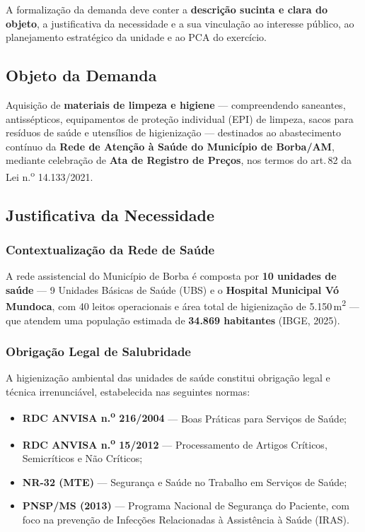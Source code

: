 \documentclass[12pt,a4paper]{article}
\begin{document}
\begin{legalbox}
\small
A formalização da demanda deve conter a \textbf{descrição sucinta e clara do objeto},
a justificativa da necessidade e a sua vinculação ao interesse público, ao
planejamento estratégico da unidade e ao PCA do exercício.
\end{legalbox}

\subsection{Objeto da Demanda}

Aquisição de \textbf{materiais de limpeza e higiene} --- compreendendo saneantes,
antissépticos, equipamentos de proteção individual (EPI) de limpeza, sacos para
resíduos de saúde e utensílios de higienização --- destinados ao abastecimento contínuo
da \textbf{Rede de Atenção à Saúde do Município de Borba/AM}, mediante celebração de
\textbf{Ata de Registro de Preços}, nos termos do art.\,82 da Lei n.\textsuperscript{o}
14.133/2021.

\subsection{Justificativa da Necessidade}

\subsubsection{Contextualização da Rede de Saúde}

A rede assistencial do Município de Borba é composta por \textbf{10 unidades de
saúde} --- 9 Unidades Básicas de Saúde (UBS) e o \textbf{Hospital Municipal Vó
Mundoca}, com 40 leitos operacionais e área total de higienização de
5.150\,m\textsuperscript{2} --- que atendem uma população estimada de
\textbf{34.869 habitantes} (IBGE, 2025).

\subsubsection{Obrigação Legal de Salubridade}

A higienização ambiental das unidades de saúde constitui obrigação legal e técnica
irrenunciável, estabelecida nas seguintes normas:

\begin{itemize}
  \item \textbf{RDC ANVISA n.\textsuperscript{o} 216/2004} --- Boas Práticas para
    Serviços de Saúde;
  \item \textbf{RDC ANVISA n.\textsuperscript{o} 15/2012} --- Processamento de
    Artigos Críticos, Semicríticos e Não Críticos;
  \item \textbf{NR-32 (MTE)} --- Segurança e Saúde no Trabalho em Serviços de Saúde;
  \item \textbf{PNSP/MS (2013)} --- Programa Nacional de Segurança do Paciente, com
    foco na prevenção de Infecções Relacionadas à Assistência à Saúde (IRAS).
\end{itemize}
\end{document}
